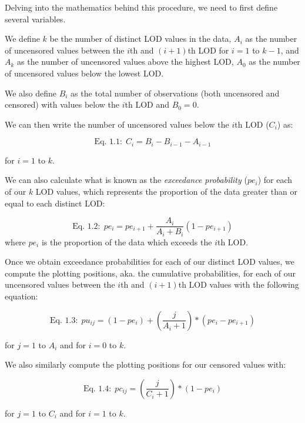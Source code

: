 \documentclass[12pt, twoside]{amherstthesis}
\begin{document}
Delving into the mathematics behind this procedure, we need to first define several variables.

We define \(k\) be the number of distinct LOD values in the data, \(A_i\) as the number of uncensored values between the \(i\)th and \((i+1)\)th LOD for \(i=1\) to \(k-1\), and \(A_k\) as the number of uncensored values above the highest LOD, \(A_0\) as the number of uncensored values below the lowest LOD.

We also define \(B_i\) as the total number of observations (both uncensored and censored) with values below the \(i\)th LOD and \(B_0 = 0\).

We can then write the number of uncensored values below the \(i\)th LOD (\(C_i\)) as:

\[\textrm{Eq. 1.1:} \ \  C_i = B_i - B_{i-1}-A_{i-1}\]

for \(i = 1\) to \(k\).

We can also calculate what is known as the \emph{exceedance probability} (\(pe_{i}\)) for each of our \(k\) LOD values, which represents the proportion of the data greater than or equal to each distinct LOD:

\[\textrm{Eq. 1.2:} \ \  pe_i = pe_{i+1} + \frac{A_i}{A_i+B_i}(1 - pe_{i+1})\]
where \(pe_i\) is the proportion of the data which exceeds the \(i\)th LOD.

Once we obtain exceedance probabilities for each of our distinct LOD values, we compute the plotting positions, aka. the cumulative probabilities, for each of our uncensored values between the \(i\)th and \((i+1)\)th LOD values with the following equation:

\[\textrm{Eq. 1.3:} \ \  pu_{ij} = (1-pe_i)+(\frac{j}{A_i+1})*(pe_i-pe_{i+1})\]

for \(j = 1\) to \(A_i\) and for \(i = 0\) to \(k\).

We also similarly compute the plotting positions for our censored values with:

\[\textrm{Eq. 1.4:} \ \  pc_{ij} = (\frac{j}{C_i+1})*(1-pe_i)\]

for \(j = 1\) to \(C_i\) and for \(i = 1\) to \(k\).
\end{document}
